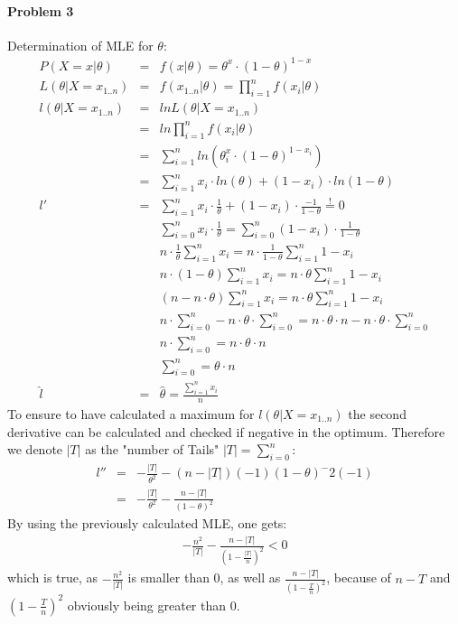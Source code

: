 \documentclass{article}
\begin{document}
\paragraph*{Problem 3}
Determination of MLE for $\theta$:
\begin{eqnarray}
P(X=x | \theta) &=& f(x|\theta) = \theta^x \cdot (1-\theta)^{1-x}\\
L(\theta | X = x_{1 .. n}) &=& f(x_{1 .. n} | \theta) = \prod_{i=1}^{n} f(x_i | \theta)\\
l(\theta | X = x_{1 .. n}) &=& ln L(\theta | X = x_{1 .. n})\\
 &=& ln \prod_{i=1}^{n} f(x_i | \theta)\\
 &=& \sum_{i=1}^{n} ln (\theta ^x_i \cdot (1-\theta)^{1-x_i})\\
 &=& \sum_{i=1}^{n} x_i \cdot ln(\theta) + (1-x_i) \cdot ln(1-\theta)\\
l' &=& \sum_{i=1}^n x_i \cdot \frac{1}{\theta} + (1-x_i) \cdot \frac{-1}{1-\theta} \overset{!}{=} 0\\
&& \sum_{i=0}^n x_i \cdot \frac{1}{\theta} = \sum_{i=0}^n (1-x_i) \cdot \frac{1}{1-\theta} \\
&& n \cdot \frac{1}{\theta} \sum_{i=1}^n x_i = n \cdot \frac{1}{1-\theta} \sum_{i=1}^n 1-x_i\\
&& n \cdot (1-\theta) \sum_{i=1}^n x_i = n \cdot \theta \sum_{i=1}^n 1-x_i\\
&& (n-n\cdot \theta) \sum_{i=1}^n x_i = n \cdot \theta \sum_{i=1}^n 1-x_i\\
&& n \cdot \sum_{i=0}^n - n \cdot \theta \cdot \sum_{i=0}^n = n \cdot \theta \cdot n - n \cdot \theta \cdot \sum_{i=0}^n\\
&& n \cdot \sum_{i=0}^n = n \cdot \theta \cdot n\\
&& \sum_{i=0}^n = \theta \cdot n\\
\hat{l} &=& \hat{\theta} = \frac{\sum_{i=1}^n x_i}{n}
\end{eqnarray}
To ensure to have calculated a maximum for $l(\theta | X = x_{1 .. n})$ the second derivative can be calculated and checked if negative in the optimum. Therefore we denote $|T|$ as the "number of Tails" $|T|=\sum_{i=0}^n$:
\begin{eqnarray}
l'' &=& -\frac{|T|}{\theta^2} - (n-|T|)(-1)(1-\theta)^-2(-1)\\
&=& -\frac{|T|}{\theta^2} - \frac{n-|T|}{(1-\theta)^2}
\end{eqnarray}
By using the previously calculated MLE, one gets:
\begin{eqnarray}
-\frac{n^2}{|T|}-\frac{n-|T|}{(1-\frac{|T|}{n})^2} <0
\end{eqnarray}
which is true, as $-\frac{n^2}{|T|}$ is smaller than 0, as well as $\frac{n-|T|}{(1-\frac{T}{n})^2}$, because of $n-T$ and $(1-\frac{T}{n})^2$ obviously being greater than 0.
\end{document}
